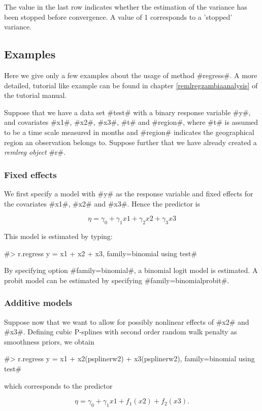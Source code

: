 The value in the last row indicates whether the estimation of the
variance has been stopped before convergence. A value of 1
corresponds to a 'stopped' variance.

\subsection{Examples}

Here we give only a few examples about the usage of method
#regress#. A more detailed, tutorial like example can be found in
chapter \ref*{remlregzambiaanalysis} of the tutorial manual.

Suppose that we have a data set #test# with a binary response
variable #y#, and covariates #x1#, #x2#, #x3#, #t# and #region#,
where #t# is assumed to be a time scale measured in months and
#region# indicates the geographical region an observation belongs
to. Suppose further that we have already created a {\em remlreg
object} #r#.

\subsubsection*{Fixed effects}

We first specify a model with #y# as the response variable and
fixed effects for the covariates #x1#, #x2# and #x3#. Hence the
predictor is

$$
\eta = \gamma_0 + \gamma_1 x1 + \gamma_2 x2 + \gamma_3 x3
$$

This model is estimated by typing:

#> r.regress y = x1 + x2 + x3, family=binomial using test#

By specifying option #family=binomial#, a binomial logit model is
estimated. A probit model can be estimated by specifying
#family=binomialprobit#.

\subsubsection*{Additive models}

Suppose now that we want to allow for possibly nonlinear effects
of #x2# and #x3#. Defining cubic P-splines with second order
random walk penalty as smoothness priors, we obtain

 #> r.regress y = x1 + x2(psplinerw2) + x3(psplinerw2), family=binomial using test#

which corresponds to the predictor

$$
\eta = \gamma_0 + \gamma_1 x1 + f_1(x2) + f_2(x3).
$$

